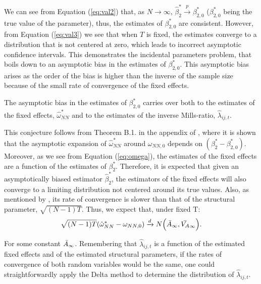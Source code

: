 We can see from Equation (\ref{eq:val2}) that, as $N \xrightarrow{} \infty$, $\hat{\beta}_2^* \xrightarrow{p} \beta_{2,0}^*$ ($\beta_{2,0}^*$ being the true value of the parameter), thus, the estimates of $\beta_{2,0}^*$ are consistent. However, from Equation (\ref{eq:val3}) we see that when $T$ is fixed, the estimates converge to a distribution that is not centered at zero, which leads to incorrect asymptotic confidence intervals. This demonstrates the incidental parameters problem, that boils down to an asymptotic bias in the estimates of $\beta_{2,0}^*$. This asymptotic bias arises as the order of the bias is higher than the inverse of the sample size because of the small rate of convergence of the fixed effects.

\begin{conjecture}
    The asymptotic bias in the estimates of $\beta_{2,0}^*$ carries over both to the estimates of the fixed effects, $\hat{\omega}_{NN}^*$ and to the estimates of the inverse Mills-ratio, $\hat{\lambda}_{ij,t}$.
\end{conjecture}

This conjecture follows from Theorem B.1. in the appendix of \cite{fernandez2016individual}, where it is shown that the asymptotic expansion of $\hat{\omega}_{NN}^*$ around $\omega_{NN,0}$ depends on $(\beta_2^* - \beta_{2,0}^*)$. Moreover, as we see from Equation (\ref{eq:omega}), the estimates of the fixed effects are a function of the estimates of $\beta_2^*$. Therefore, it is expected that given an asymptotically biased estimator $\hat{\beta}_2^*$, the estimators of the fixed effects will also converge to a limiting distribution not centered around its true values. Also, as mentioned by \cite{fernandez2016individual}, its rate of convergence is slower than that of the structural parameter, $\sqrt{(N-1)T}$. Thus, we expect that, under fixed T:
\begin{align} \label{eq:val4}
\sqrt{(N-1)T} (\hat{\omega}_{NN}^* - \omega_{NN,0}) \xrightarrow{d} N\Big( {\Bar{A}_\infty} , \Bar{V_A}_\infty\Big).
\end{align}

For some constant $\Bar{A}_\infty$. Remembering that $\hat{\lambda}_{ij,t}$ is a function of the estimated fixed effects and of the estimated structural parameters, if the rates of convergence of both random variables would be the same, one could straightforwardly apply the Delta method to determine the distribution of $\hat{\lambda}_{ij,t}$. 

